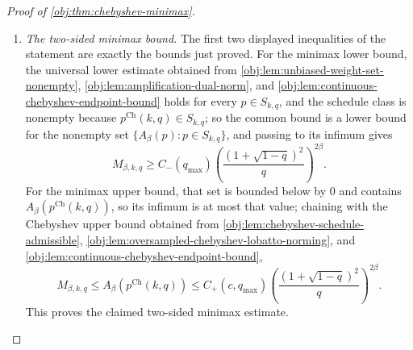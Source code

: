 \documentclass[11pt]{article}
\begin{document}
\begin{proof}[Proof of \cref{obj:thm:chebyshev-minimax}]
\begin{enumerate}
\item \emph{The two-sided minimax bound.}
The first two displayed inequalities of the statement are exactly the bounds just proved. For the minimax
lower bound, the universal lower estimate obtained from \cref{obj:lem:unbiased-weight-set-nonempty}, \cref{obj:lem:amplification-dual-norm}, and \cref{obj:lem:continuous-chebyshev-endpoint-bound} holds for every \(p\in S_{k,q}\), and the schedule class is
nonempty because \(p^{\mathrm{Ch}}(k,q)\in S_{k,q}\); so the common bound is a lower bound for the nonempty set \(\{A_\beta(p):p\in S_{k,q}\}\), and passing to its infimum gives
\[
M_{\beta,k,q}
\ge
C_-(q_{\max})
\left(\frac{(1+\sqrt{1-q})^2}{q}\right)^{2\beta}.
\]
For the minimax upper bound, that set is bounded below by \(0\) and contains \(A_\beta(p^{\mathrm{Ch}}(k,q))\), so its infimum is at most that value; chaining with the Chebyshev upper bound obtained from \cref{obj:lem:chebyshev-schedule-admissible}, \cref{obj:lem:oversampled-chebyshev-lobatto-norming}, and \cref{obj:lem:continuous-chebyshev-endpoint-bound},
\[
M_{\beta,k,q}
\le
A_\beta\!\left(p^{\mathrm{Ch}}(k,q)\right)
\le
C_+(c,q_{\max})
\left(\frac{(1+\sqrt{1-q})^2}{q}\right)^{2\beta}.
\]
This proves the claimed two-sided minimax estimate.
\end{enumerate}
\end{proof}
\end{document}
